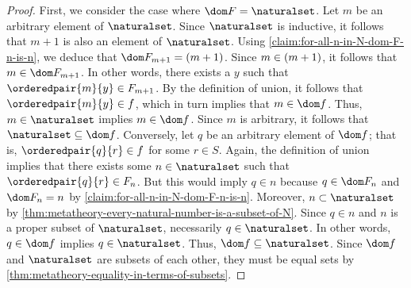 \begin{proof}
    \vspace{0.3cm}
    \noindent
    First, we consider the case where \( \dom F = \naturalset \).
    Let \( m \) be an arbitrary element of \( \naturalset \).
    Since \( \naturalset \) is inductive, it follows that \( m + 1 \) is also an element of \( \naturalset \).
    Using \cref{claim:for-all-n-in-N-dom-F-n-is-n}, we deduce that \( \dom F_{m + 1} = \mleft( m + 1 \mright) \).
    Since \( m \in \mleft( m + 1 \mright) \), it follows that \( m \in \dom F_{m + 1} \). In other words, there exists a
    \( y \) such that \( \orderedpair{m}{y} \in F_{m + 1} \).
    By the definition of union, it follows that \( \orderedpair{m}{y} \in f \), which in turn implies that \( m \in \dom f \).
    Thus, \( m \in \naturalset \) implies \( m \in \dom f \).
    Since \( m \) is arbitrary, it follows that \( \naturalset \subseteq \dom f \).
    Conversely, let \( q \) be an arbitrary element of \( \dom f \); that is, \( \orderedpair{q}{r} \in f \) for some \( r \in S \).
    Again, the definition of union implies that there exists some \( n \in \naturalset \) such that \( \orderedpair{q}{r} \in F_{n} \).
    But this would imply \( q \in n \) because \( q \in \dom F_{n} \) and \( \dom F_{n} = n \) by \cref{claim:for-all-n-in-N-dom-F-n-is-n}.
    Moreover, \( n \subset \naturalset \) by \cref{thm:metatheory-every-natural-number-is-a-subset-of-N}.
    Since \( q \in n \) and \( n \) is a proper subset of \( \naturalset \), necessarily \( q \in \naturalset \).
    In other words, \( q \in \dom f\) implies \( q \in \naturalset \).
    Thus, \( \dom f \subseteq \naturalset \).
    Since \( \dom f \) and \( \naturalset \) are subsets of each other, they must be equal sets by \cref{thm:metatheory-equality-in-terms-of-subsets}.


\end{proof}
